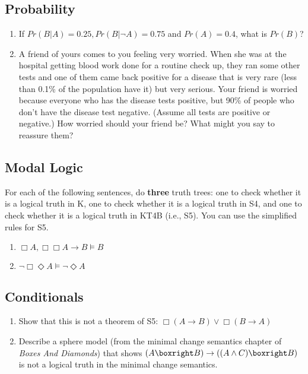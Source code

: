 \documentclass[
  11pt,
]{article}
\providecommand{\tightlist}{%
  \setlength{\itemsep}{0pt}\setlength{\parskip}{0pt}}
\begin{document}
\hypertarget{probability}{%
\subsection{Probability}\label{probability}}

\begin{enumerate}
\def\labelenumi{\arabic{enumi}.}
\setcounter{enumi}{5}
\tightlist
\item
  If \(Pr(B | A) = 0.25, Pr(B | \neg A) = 0.75\) and \(Pr(A) = 0.4\),
  what is \(Pr(B)\)?
\item
  A friend of yours comes to you feeling very worried. When she was at
  the hospital getting blood work done for a routine check up, they ran
  some other tests and one of them came back positive for a disease that
  is very rare (less than 0.1\% of the population have it) but very
  serious. Your friend is worried because everyone who has the
  disease tests positive, but 90\% of people who don't have the disease
  test negative. (Assume all tests are positive or negative.) How
  worried should your friend be? What might you say to reassure them?
\end{enumerate}

\hypertarget{modal-logic}{%
\subsection{Modal Logic}\label{modal-logic}}

For each of the following sentences, do \textbf{three} truth trees: one
to check whether it is a logical truth in K, one to check whether it is
a logical truth in S4, and one to check whether it is a logical truth in
KT4B (i.e., S5). You can use the simplified rules for S5.

\begin{enumerate}
\def\labelenumi{\arabic{enumi}.}
\setcounter{enumi}{7}
\tightlist
\item
  \(\Box A, \Box \Box A \rightarrow B \vDash B\)
\item
  \(\neg \Box \Diamond A \vDash \neg \Diamond A\)
\end{enumerate}

\hypertarget{conditionals}{%
\subsection{Conditionals}\label{conditionals}}

\begin{enumerate}
\def\labelenumi{\arabic{enumi}.}
\setcounter{enumi}{9}
\tightlist
\item
  Show that this is not a theorem of S5:
  \(\Box (A \rightarrow B) \vee \Box (B \rightarrow A)\)
\item
  Describe a sphere model (from the minimal change semantics chapter of
  \emph{Boxes And Diamonds}) that shows
  \((A \boxright B) \rightarrow ((A \wedge C) \boxright B)\) is not a
  logical truth in the minimal change semantics.
\end{enumerate}
\end{document}
